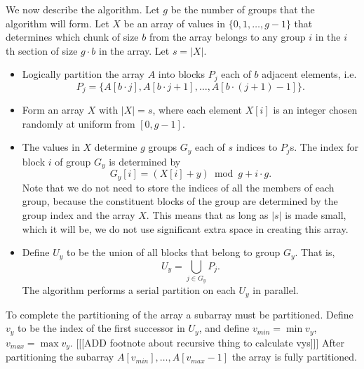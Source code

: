\documentclass[sigconf]{acmart}
\renewcommand{\paragraph}[1]{\vspace{0.09in}\noindent{\bf \boldmath #1.}}
\theoremstyle{remark}
\theoremstyle{remark}
\begin{document}
\paragraph{Algorithm Description}
We now describe the algorithm.
Let $g$ be the number of groups that the algorithm will form.
Let $X$ be an array of values in $\{0,1,\ldots,g-1\}$ that determines which chunk of size $b$ from the array belongs to any group $i$ in the $i$ th section of size $g\cdot b$ in the array.
Let $s=|X|$.
\begin{itemize}
	\item Logically partition the array $A$ into blocks $P_j$ each of $b$ adjacent elements, i.e. $${P_j = \{A[b\cdot j], A[b\cdot j + 1], \ldots, A[b\cdot (j+1)-1]\}}.$$
	\item Form an array $X$ with $|X|=s$, where each element $X[i]$ is an integer chosen randomly at uniform from $[0, g-1].$
	\item The values in $X$ determine $g$ groups $G_y$ each of $s$ indices to $P_j$s. The index for block $i$ of group $G_y$ is determined by
		$$G_y[i] = (X[i] + y) \bmod g + i\cdot g.$$
		Note that we do not need to store the indices of all the members of each group, because the constituent blocks of the group are determined by the group index and the array $X$. 
		This means that as long as $|s|$ is made small, which it will be, we do not use significant extra space in creating this array.  
	\item Define $U_y$ to be the union of all blocks that belong to group $G_y$. That is,
			$$U_y = \bigcup_{j\in G_y} P_j.$$ 
		The algorithm performs a serial partition on each $U_y$ in parallel.
\end{itemize}
To complete the partitioning of the array a subarray must be partitioned. 
Define $v_y$ to be the index of the first successor in $U_y$, and define $v_{min}=\min{v_y}$,  $v_{max}=\max{v_y}$. 
[[[ADD footnote about recursive thing to calculate vys]]]
After partitioning the subarray ${A[v_{min}],\ldots,A[v_{max}-1]}$ the array is fully partitioned.
\end{document}
